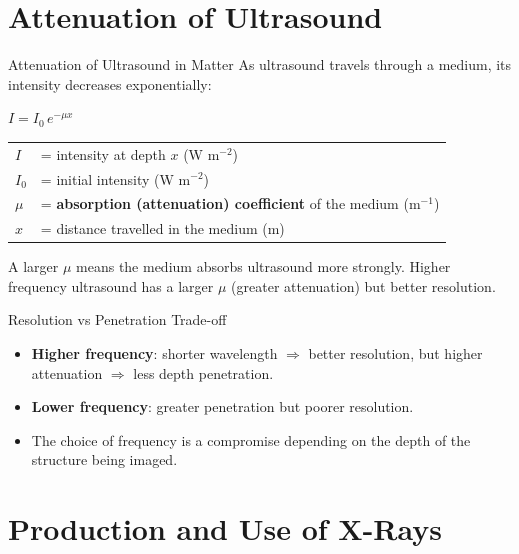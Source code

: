 \section{Attenuation of Ultrasound}

\begin{formulabox}{Attenuation of Ultrasound in Matter}
As ultrasound travels through a medium, its intensity decreases exponentially:
\begin{center}
\Large $I = I_0\,e^{-\mu x}$
\end{center}
\vspace{0.3em}
\begin{tabular}{@{}ll@{}}
$I$ & = intensity at depth $x$ (W m$^{-2}$) \\
$I_0$ & = initial intensity (W m$^{-2}$) \\
$\mu$ & = \textbf{absorption (attenuation) coefficient} of the medium (m$^{-1}$) \\
$x$ & = distance travelled in the medium (m) \\
\end{tabular}
\vspace{0.4em}

A larger $\mu$ means the medium absorbs ultrasound more strongly. Higher frequency ultrasound has a larger $\mu$ (greater attenuation) but better resolution.
\end{formulabox}

\begin{warningbox}{Resolution vs Penetration Trade-off}
\begin{itemize}[itemsep=2pt]
  \item \textbf{Higher frequency}: shorter wavelength $\Rightarrow$ better resolution, but higher attenuation $\Rightarrow$ less depth penetration.
  \item \textbf{Lower frequency}: greater penetration but poorer resolution.
  \item The choice of frequency is a compromise depending on the depth of the structure being imaged.
\end{itemize}
\end{warningbox}

\section{Production and Use of X-Rays}

